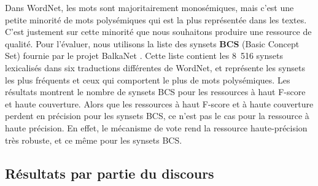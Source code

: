 Dans WordNet, les mots sont majoritairement monosémiques, mais c'est une petite
minorité de mots polysémiques qui est la plus représentée dans les textes.
C'est justement sur cette minorité que nous souhaitons produire une ressource
de qualité. Pour l'évaluer, nous utilisons la liste des synsets \textbf{BCS}
(Basic Concept Set) fournie par le projet BalkaNet \citep{tufis2004balkanet}.
Cette liste contient les 8~516 synsets lexicalisés dans six traductions
différentes de WordNet, et représente les synsets les plus fréquents et ceux
qui comportent le plus de mots polysémiques. Les résultats montrent le nombre
de synsets BCS pour les ressources à haut F-score et haute couverture. Alors
que les ressources à haut F-score et à haute couverture perdent en précision
pour les synsets BCS, ce n'est pas le cas pour la ressource à haute précision.
En effet, le mécanisme de vote rend la ressource haute-précision très robuste,
et ce même pour les synsets BCS.



\subsection{Résultats par partie du discours}
\label{subsec:selectors}


